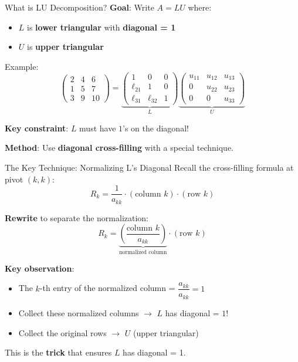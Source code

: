 \documentclass[10pt]{beamer}
\theoremstyle{definition}
\newcommand{\x}[1]{\alert{\textbf{#1}}}
\begin{document}
\begin{frame}{What is LU Decomposition?}
\textbf{Goal}: Write $A = LU$ where:
\begin{itemize}
\item $L$ is \x{lower triangular} with \x{diagonal = 1}
\item $U$ is \x{upper triangular}
\end{itemize}

\vfill
Example:
$$\begin{pmatrix}
2 & 4 & 6 \\
1 & 5 & 7 \\
3 & 9 & 10
\end{pmatrix}
= \underbrace{\begin{pmatrix}
1 & 0 & 0 \\
\ell_{21} & 1 & 0 \\
\ell_{31} & \ell_{32} & 1
\end{pmatrix}}_{L}
\underbrace{\begin{pmatrix}
u_{11} & u_{12} & u_{13} \\
0 & u_{22} & u_{23} \\
0 & 0 & u_{33}
\end{pmatrix}}_{U}$$

\vfill
\textbf{Key constraint}: $L$ must have $1$'s on the diagonal!

\vfill
\textbf{Method}: Use \x{diagonal cross-filling} with a special technique.
\end{frame}

\begin{frame}{The Key Technique: Normalizing L's Diagonal}
Recall the cross-filling formula at pivot $(k,k)$:
$$R_k = \frac{1}{a_{kk}} \cdot (\text{column } k) \cdot (\text{row } k)$$

\vfill
\textbf{Rewrite} to separate the normalization:
$$R_k = \underbrace{\left(\frac{\text{column } k}{a_{kk}}\right)}_{\text{normalized column}} \cdot (\text{row } k)$$

\vfill
\textbf{Key observation}:
\begin{itemize}
\item The $k$-th entry of the normalized column = $\dfrac{a_{kk}}{a_{kk}} = 1$
\item Collect these normalized columns $\to$ $L$ has diagonal = $1$!
\item Collect the original rows $\to$ $U$ (upper triangular)
\end{itemize}

\vfill
This is the \x{trick} that ensures $L$ has diagonal = 1.
\end{frame}
\end{document}
